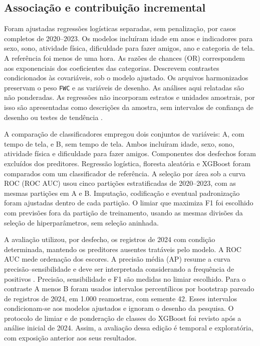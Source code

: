 ﻿\documentclass[12pt]{article}
\begin{document}
\subsection{Associação e contribuição incremental}
Foram ajustadas regressões logísticas separadas, sem penalização, por casos completos de 2020--2023. Os modelos incluíram idade em anos e indicadores para sexo, sono, atividade física, dificuldade para fazer amigos, ano e categoria de tela. A referência foi menos de uma hora. As razões de chances (OR) correspondem aos exponenciais dos coeficientes das categorias. Descrevem contrastes condicionados às covariáveis, sob o modelo ajustado. Os arquivos harmonizados preservam o peso \texttt{FWC} e as variáveis de desenho. As análises aqui relatadas são não ponderadas. As regressões não incorporam estratos e unidades amostrais, por isso são apresentadas como descrições da amostra, sem intervalos de confiança de desenho ou testes de tendência \cite{censusguide}.

A comparação de classificadores empregou dois conjuntos de variáveis: A, com tempo de tela, e B, sem tempo de tela. Ambos incluíram idade, sexo, sono, atividade física e dificuldade para fazer amigos. Componentes dos desfechos foram excluídos dos preditores. Regressão logística, floresta aleatória e XGBoost foram comparados com um classificador de referência. A seleção por área sob a curva ROC (ROC AUC) usou cinco partições estratificadas de 2020--2023, com as mesmas partições em A e B. Imputação, codificação e eventual padronização foram ajustadas dentro de cada partição. O limiar que maximiza F1 foi escolhido com previsões fora da partição de treinamento, usando as mesmas divisões da seleção de hiperparâmetros, sem seleção aninhada.

A avaliação utilizou, por desfecho, os registros de 2024 com condição determinada, mantendo os preditores ausentes tratáveis pelo modelo. A ROC AUC mede ordenação dos escores. A precisão média (AP) resume a curva precisão--sensibilidade e deve ser interpretada considerando a frequência de positivos \cite{saito2015}. Precisão, sensibilidade e F1 são medidas no limiar escolhido. Para o contraste A menos B foram usados intervalos percentílicos por bootstrap pareado de registros de 2024, em 1.000 reamostras, com semente 42. Esses intervalos condicionam-se aos modelos ajustados e ignoram o desenho da pesquisa. O protocolo de limiar e de ponderação de classes do XGBoost foi revisto após a análise inicial de 2024. Assim, a avaliação dessa edição é temporal e exploratória, com exposição anterior aos seus resultados.
\end{document}
